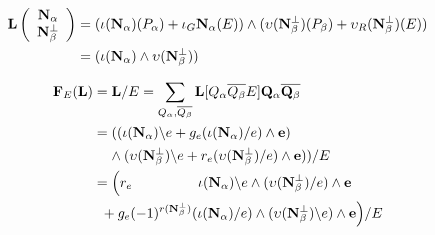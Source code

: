 \documentclass{beamer}
\newcommand{\ext}[1]{\ensuremath{\mathbf{#1}}}
\newcommand{\Is}{\ensuremath{\iota}}
\newcommand{\Vs}{\ensuremath{\upsilon}}
\begin{document}
\begin{frame}

\[
\begin{split}
  \ext{L}\left( \begin{array}{c} \eNal\\ \eNbePe \end{array} \right)
   & = (\Is(\eNal)(P_\alpha) + \Is_G\eNal(E))\wedge(\Vs(\eNbePe)(P_\beta) + \Vs_R(\eNbePe)(E)) \\
  &  = (\Is(\eNal)\wedge\Vs(\eNbePe))
\end{split}
\]

\[
\begin{split}
  \ext{F}_E(\ext{L})& = \ext{L}/E = \sum_{Q_\alpha,\overline{Q_\beta}}\ext{L}[Q_\alpha \overline{Q_\beta} E]\ext{Q}_\alpha\overline{\ext{Q}_\beta} \\
  & =   ((\Is(\eNal)\backslash   e + g_e(\Is(\eNal)/e)\wedge\ext{e})                   \\
  & \;\;\;\;  \wedge  (\Vs(\eNbePe)\backslash e + r_e(\Vs(\eNbePe)/e)\wedge \ext{e}) ) / E \\
  & = \Big( r_e  \;\;\; \;\;\;\;\;\;\;\;\;\;\;\;\;\; \Is(\ext{\eNal})\backslash e\wedge (\Vs(\eNbePe)/e)      \wedge  \ext{e} \\
  & \;\;+ g_e (-1)^{r(\eNbePe)}(\Is(\eNal)/e)\wedge(\Vs(\eNbePe)\backslash e)    \wedge  \ext{e}\Big) / E 
  \end{split}
\]
 

\end{frame}


\newcommand{\eNbe}{\ensuremath{\ext{N}_\beta}}
\newcommand{\Nbe}{\ensuremath{N_\beta}}
\end{document}
